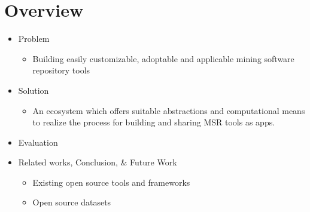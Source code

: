 \section{Overview}

\begin{frame}
\begin{itemize}
  \item Problem
  \begin{itemize}
    \item Building easily customizable, adoptable and applicable mining software repository tools
  \end{itemize}

  \item Solution
  \begin{itemize}
    \item An ecosystem which offers suitable abstractions and computational means to realize the
    process for building and sharing MSR tools as apps.
  \end{itemize}


  \item Evaluation

  \item Related works, Conclusion, \& Future Work
  	  \begin{itemize}
  	    \item Existing open source tools and frameworks
  	    \item Open source datasets
  	  \end{itemize}
\end{itemize}
\end{frame}

